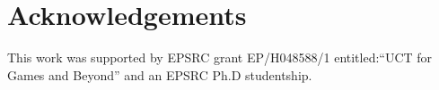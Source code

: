 \documentclass[conference]{IEEEtran}
\begin{document}
 
\section*{Acknowledgements}
This work was supported by EPSRC grant EP/H048588/1 entitled:``UCT for Games and Beyond'' and an EPSRC Ph.D studentship. 





\end{document}
